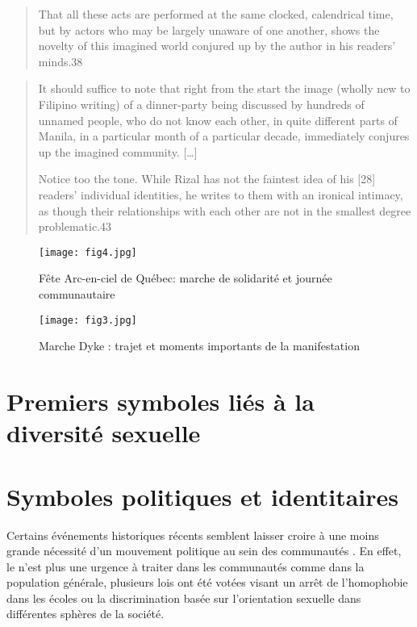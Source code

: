 \begin{quote}
  That all these acts are performed at the same clocked, calendrical time, but   by actors who may be largely unaware of one another, shows the novelty of this imagined world conjured up by the author in his readers' minds.38
  \citep{Anderson 1983}
\end{quote}

\begin{quote}
	
It should suffice to note that right from the start the image (wholly new to Filipino writing) of a dinner-party being discussed by hundreds of unnamed people, who do not know each other, in quite different parts of Manila, in a particular month of a particular decade, immediately conjures up the imagined community.
[\ldots]

Notice too the tone. 
While Rizal has not the faintest idea of his [28] readers' individual identities, he writes to them with an ironical intimacy, as though their relationships with each other are not in the smallest degree problematic.43
\end{quote}


\begin{figure}[ht]
	\centering
	\texttt{[image: fig4.jpg]}
	\caption{Fête Arc-en-ciel de Québec: marche de solidarité et journée
    communautaire}
	\label{fig:figure4}
\end{figure}

\begin{figure}[ht]
	\centering
	\texttt{[image: fig3.jpg]}
	\caption[]{Marche Dyke : trajet et moments importants de la manifestation}
	\label{fig:figure3}
\end{figure}


\section{Premiers symboles liés à la diversité sexuelle}
\label{sec:premiers_symboles_li_s_la_diversit_sexuelle}


\section{Symboles politiques et identitaires}
\label{sec:symboles_politiques_et_identitaire}
Certains événements historiques récents semblent laisser croire à une moins grande nécessité d'un mouvement politique au sein des communautés \lgbt{}.
En effet, le \sida{} n'est plus une urgence à traiter dans les communautés \lgbt{} comme dans la population générale, plusieurs lois ont été votées visant un arrêt de l'homophobie dans les écoles ou la discrimination basée sur l'orientation sexuelle dans différentes sphères de la société.

